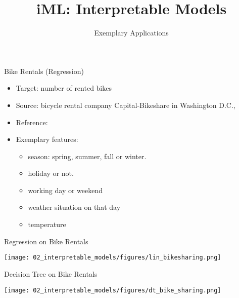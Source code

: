 \documentclass[aspectratio=169]{../latex_main/tntbeamer}  %
\title[Introduction]{iML: Interpretable Models}
\subtitle{Exemplary Applications}
\begin{document}
	
	\maketitle


    \begin{frame}{Bike Rentals (Regression)}
        
        \begin{itemize}
            \item Target: number of rented bikes
            \item Source: bicycle rental company Capital-Bikeshare in Washington D.C.,
            \item Reference: 
            \item Exemplary features:
            \begin{itemize}
                \item season: spring, summer, fall or winter.
                \item holiday or not.
                \item working day or weekend
                \item weather situation on that day 
                \item temperature
            \end{itemize}
        \end{itemize}
        
    \end{frame}
    
    \begin{frame}{Regression on Bike Rentals}
        
        \centering
        \texttt{[image: 02\_interpretable\_models/figures/lin\_bikesharing.png]}        

    \end{frame}
    
    \begin{frame}{Decision Tree on Bike Rentals}
        
        \centering
        \texttt{[image: 02\_interpretable\_models/figures/dt\_bike\_sharing.png]}        

    \end{frame}
    
\end{document}
